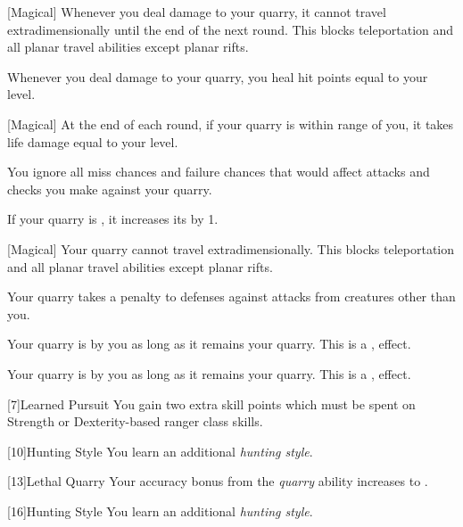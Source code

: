            [Magical]
            Whenever you deal damage to your quarry, it cannot travel extradimensionally until the end of the next round.
            This blocks teleportation and all planar travel abilities except planar rifts.

            Whenever you deal damage to your quarry, you heal hit points equal to your level.

            [Magical]
            At the end of each round, if your quarry is within \rnglong range of you, it takes life damage equal to your level.

            You ignore all miss chances and failure chances that would affect attacks and checks you make against your quarry.

            If your quarry is , it increases its  by 1.

            [Magical]
            Your quarry cannot travel extradimensionally.
            This blocks teleportation and all planar travel abilities except planar rifts.

            Your quarry takes a  penalty to defenses against attacks from creatures other than you.

            Your quarry is \taunted by you as long as it remains your quarry.
            This is a ,  effect.

            Your quarry is \frightened by you as long as it remains your quarry.
            This is a ,  effect.

            [7]{Learned Pursuit} You gain two extra skill points which must be spent on Strength or Dexterity-based ranger class skills.

            [10]{Hunting Style}
            You learn an additional \textit{hunting style}.

            [13]{Lethal Quarry}
            Your accuracy bonus from the \textit{quarry} ability increases to .

            [16]{Hunting Style}
            You learn an additional \textit{hunting style}.

